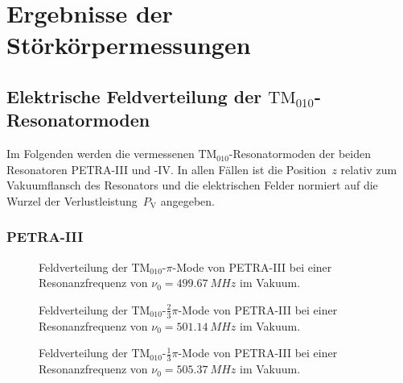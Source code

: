 \chapter{Ergebnisse der Störkörpermessungen}
\label{sec:appendix_felder}

\section{Elektrische Feldverteilung der $\mathrm{TM}_{010}$-Resonatormoden}
\label{app:tm010_felder}
Im Folgenden werden die vermessenen $\mathrm{TM}_{010}$-Resonatormoden der beiden Resonatoren PETRA-III und -IV.
In allen Fällen ist die Position~$z$ relativ zum Vakuumflansch des Resonators und die elektrischen Felder normiert auf die Wurzel der Verlustleistung~$P_\mathrm{V}$ angegeben.

\subsection{PETRA-III}
\FloatBarrier
\begin{figure}[h]
  \centering
  
  \caption[Feldverteilung der $\mathrm{TM}_{010}\text{-}\pi$-Mode von PETRA-III]{Feldverteilung der $\mathrm{TM}_{010}\text{-}\pi$-Mode von PETRA-III bei einer Resonanzfrequenz von $\nu_0 = \SI{499.67}{MHz}$ im Vakuum.}
\end{figure}

\begin{figure}[p]
	\centering
	
	
	\caption[Feldverteilung der $\mathrm{TM}_{010}\text{-}\frac{2}{3}\pi$-Mode von PETRA-III]{Feldverteilung der $\mathrm{TM}_{010}\text{-}\frac{2}{3}\pi$-Mode von PETRA-III bei einer Resonanzfrequenz von $\nu_0 = \SI{501.14}{MHz}$ im Vakuum.}
	
	
	\caption[Feldverteilung der $\mathrm{TM}_{010}\text{-}\frac{1}{3}\pi$-Mode von PETRA-III]{Feldverteilung der $\mathrm{TM}_{010}\text{-}\frac{1}{3}\pi$-Mode von PETRA-III bei einer Resonanzfrequenz von $\nu_0 = \SI{505.37}{MHz}$ im Vakuum.}
\end{figure}

